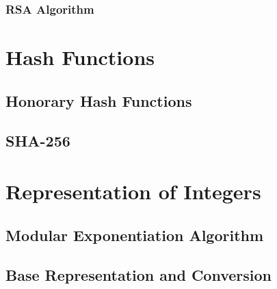 \documentclass[oneside]{book}
\begin{document}
\subsubsection{RSA Algorithm}
\section{Hash Functions}
\subsection{Honorary Hash Functions}
\subsection{SHA-256}
\section{Representation of Integers}
\subsection{Modular Exponentiation Algorithm}
\subsection{Base Representation and Conversion}

\nocite{*}
\printbibliography
\end{document}
